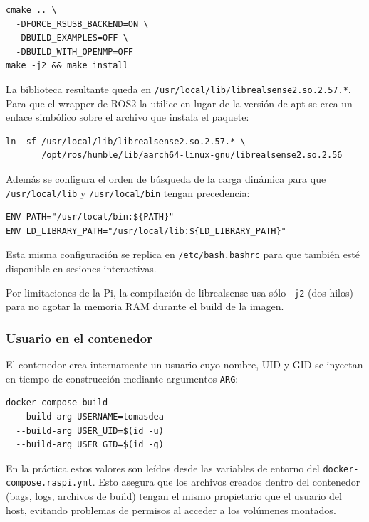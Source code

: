 \begin{verbatim}
cmake .. \
  -DFORCE_RSUSB_BACKEND=ON \
  -DBUILD_EXAMPLES=OFF \
  -DBUILD_WITH_OPENMP=OFF
make -j2 && make install
\end{verbatim}

La biblioteca resultante queda en \texttt{/usr/local/lib/librealsense2.so.2.57.*}.
Para que el wrapper de ROS2 la utilice en lugar de la versión de apt se crea
un enlace simbólico sobre el archivo que instala el paquete:

\begin{verbatim}
ln -sf /usr/local/lib/librealsense2.so.2.57.* \
       /opt/ros/humble/lib/aarch64-linux-gnu/librealsense2.so.2.56
\end{verbatim}

Además se configura el orden de búsqueda de la carga dinámica para que
\texttt{/usr/local/lib} y \texttt{/usr/local/bin} tengan precedencia:

\begin{verbatim}
ENV PATH="/usr/local/bin:${PATH}"
ENV LD_LIBRARY_PATH="/usr/local/lib:${LD_LIBRARY_PATH}"
\end{verbatim}

Esta misma configuración se replica en \texttt{/etc/bash.bashrc} para que
también esté disponible en sesiones interactivas.

Por limitaciones de la Pi, la compilación de librealsense usa sólo
\texttt{-j2} (dos hilos) para no agotar la memoria RAM durante el build de
la imagen.

\subsubsection{Usuario en el contenedor}

El contenedor crea internamente un usuario cuyo nombre, UID y GID se
inyectan en tiempo de construcción mediante argumentos \texttt{ARG}:

\begin{verbatim}
docker compose build
  --build-arg USERNAME=tomasdea
  --build-arg USER_UID=$(id -u)
  --build-arg USER_GID=$(id -g)
\end{verbatim}

En la práctica estos valores son leídos desde las variables de entorno del
\texttt{docker-compose.raspi.yml}. Esto asegura que los archivos creados
dentro del contenedor (bags, logs, archivos de build) tengan el mismo
propietario que el usuario del host, evitando problemas de permisos al
acceder a los volúmenes montados.

